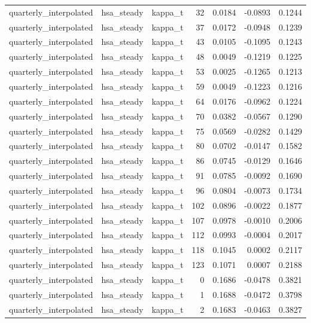 \begin{tabular}{lllrrrr}
quarterly\_interpolated & hsa\_steady & kappa\_t & 32 & 0.0184 & -0.0893 & 0.1244 \\
quarterly\_interpolated & hsa\_steady & kappa\_t & 37 & 0.0172 & -0.0948 & 0.1239 \\
quarterly\_interpolated & hsa\_steady & kappa\_t & 43 & 0.0105 & -0.1095 & 0.1243 \\
quarterly\_interpolated & hsa\_steady & kappa\_t & 48 & 0.0049 & -0.1219 & 0.1225 \\
quarterly\_interpolated & hsa\_steady & kappa\_t & 53 & 0.0025 & -0.1265 & 0.1213 \\
quarterly\_interpolated & hsa\_steady & kappa\_t & 59 & 0.0049 & -0.1223 & 0.1216 \\
quarterly\_interpolated & hsa\_steady & kappa\_t & 64 & 0.0176 & -0.0962 & 0.1224 \\
quarterly\_interpolated & hsa\_steady & kappa\_t & 70 & 0.0382 & -0.0567 & 0.1290 \\
quarterly\_interpolated & hsa\_steady & kappa\_t & 75 & 0.0569 & -0.0282 & 0.1429 \\
quarterly\_interpolated & hsa\_steady & kappa\_t & 80 & 0.0702 & -0.0147 & 0.1582 \\
quarterly\_interpolated & hsa\_steady & kappa\_t & 86 & 0.0745 & -0.0129 & 0.1646 \\
quarterly\_interpolated & hsa\_steady & kappa\_t & 91 & 0.0785 & -0.0092 & 0.1690 \\
quarterly\_interpolated & hsa\_steady & kappa\_t & 96 & 0.0804 & -0.0073 & 0.1734 \\
quarterly\_interpolated & hsa\_steady & kappa\_t & 102 & 0.0896 & -0.0022 & 0.1877 \\
quarterly\_interpolated & hsa\_steady & kappa\_t & 107 & 0.0978 & -0.0010 & 0.2006 \\
quarterly\_interpolated & hsa\_steady & kappa\_t & 112 & 0.0993 & -0.0004 & 0.2017 \\
quarterly\_interpolated & hsa\_steady & kappa\_t & 118 & 0.1045 & 0.0002 & 0.2117 \\
quarterly\_interpolated & hsa\_steady & kappa\_t & 123 & 0.1071 & 0.0007 & 0.2188 \\
quarterly\_interpolated & hsa\_steady & kappa\_t & 0 & 0.1686 & -0.0478 & 0.3821 \\
quarterly\_interpolated & hsa\_steady & kappa\_t & 1 & 0.1688 & -0.0472 & 0.3798 \\
quarterly\_interpolated & hsa\_steady & kappa\_t & 2 & 0.1683 & -0.0463 & 0.3827 \\

\end{tabular}
